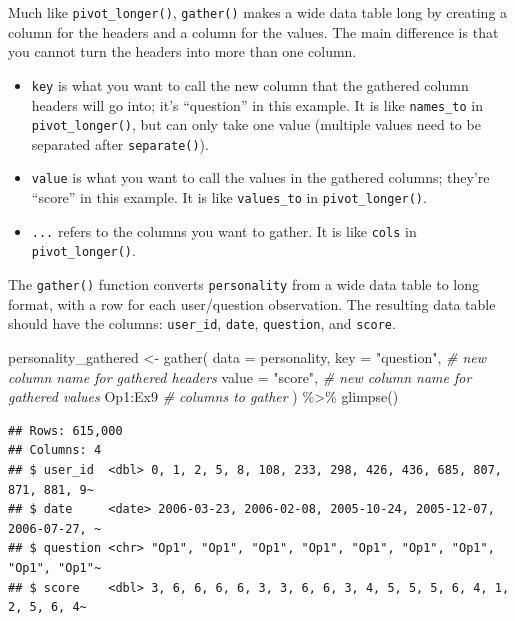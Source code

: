 \documentclass[
  oneside]{book}
\newenvironment{Shaded}{\begin{snugshade}}{\end{snugshade}}
\newcommand{\AttributeTok}[1]{\textcolor[rgb]{0.77,0.63,0.00}{#1}}
\newcommand{\CommentTok}[1]{\textcolor[rgb]{0.56,0.35,0.01}{\textit{#1}}}
\newcommand{\FunctionTok}[1]{\textcolor[rgb]{0.00,0.00,0.00}{#1}}
\newcommand{\NormalTok}[1]{#1}
\newcommand{\OtherTok}[1]{\textcolor[rgb]{0.56,0.35,0.01}{#1}}
\newcommand{\SpecialCharTok}[1]{\textcolor[rgb]{0.00,0.00,0.00}{#1}}
\newcommand{\StringTok}[1]{\textcolor[rgb]{0.31,0.60,0.02}{#1}}
\providecommand{\tightlist}{%
  \setlength{\itemsep}{0pt}\setlength{\parskip}{0pt}}
\begin{document}
Much like \texttt{pivot\_longer()}, \texttt{gather()} makes a wide data table long by creating a column for the headers and a column for the values. The main difference is that you cannot turn the headers into more than one column.

\begin{itemize}
\tightlist
\item
  \texttt{key} is what you want to call the new column that the gathered column headers will go into; it's ``question'' in this example. It is like \texttt{names\_to} in \texttt{pivot\_longer()}, but can only take one value (multiple values need to be separated after \texttt{separate()}).
\item
  \texttt{value} is what you want to call the values in the gathered columns; they're ``score'' in this example. It is like \texttt{values\_to} in \texttt{pivot\_longer()}.
\item
  \texttt{...} refers to the columns you want to gather. It is like \texttt{cols} in \texttt{pivot\_longer()}.
\end{itemize}

The \texttt{gather()} function converts \texttt{personality} from a wide data table to long format, with a row for each user/question observation. The resulting data table should have the columns: \texttt{user\_id}, \texttt{date}, \texttt{question}, and \texttt{score}.

\begin{Shaded}
\begin{Highlighting}[]
\NormalTok{personality\_gathered }\OtherTok{\textless{}{-}} \FunctionTok{gather}\NormalTok{(}
  \AttributeTok{data =}\NormalTok{ personality, }
  \AttributeTok{key =} \StringTok{"question"}\NormalTok{, }\CommentTok{\# new column name for gathered headers}
  \AttributeTok{value =} \StringTok{"score"}\NormalTok{,  }\CommentTok{\# new column name for gathered values}
\NormalTok{  Op1}\SpecialCharTok{:}\NormalTok{Ex9           }\CommentTok{\# columns to gather}
\NormalTok{) }\SpecialCharTok{\%\textgreater{}\%}
  \FunctionTok{glimpse}\NormalTok{()}
\end{Highlighting}
\end{Shaded}

\begin{verbatim}
## Rows: 615,000
## Columns: 4
## $ user_id  <dbl> 0, 1, 2, 5, 8, 108, 233, 298, 426, 436, 685, 807, 871, 881, 9~
## $ date     <date> 2006-03-23, 2006-02-08, 2005-10-24, 2005-12-07, 2006-07-27, ~
## $ question <chr> "Op1", "Op1", "Op1", "Op1", "Op1", "Op1", "Op1", "Op1", "Op1"~
## $ score    <dbl> 3, 6, 6, 6, 6, 3, 3, 6, 6, 3, 4, 5, 5, 5, 6, 4, 1, 2, 5, 6, 4~
\end{verbatim}
\end{document}
